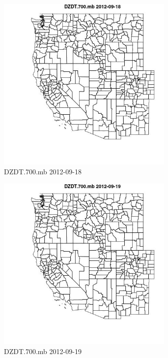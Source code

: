 \begin{figure} 
\centering  
\includegraphics[width=0.77\textwidth]{Code_Outputs/ML_input_report_ML_input_PM25_Step5_part_d_de_duplicated_aves_ML_input_MapObsDZDT700mb2012-09-18.jpg} 
\caption{\label{fig:ML_input_report_ML_input_PM25_Step5_part_d_de_duplicated_aves_ML_inputMapObsDZDT700mb2012-09-18}DZDT.700.mb 2012-09-18} 
\end{figure} 
 

\begin{figure} 
\centering  
\includegraphics[width=0.77\textwidth]{Code_Outputs/ML_input_report_ML_input_PM25_Step5_part_d_de_duplicated_aves_ML_input_MapObsDZDT700mb2012-09-19.jpg} 
\caption{\label{fig:ML_input_report_ML_input_PM25_Step5_part_d_de_duplicated_aves_ML_inputMapObsDZDT700mb2012-09-19}DZDT.700.mb 2012-09-19} 
\end{figure} 
 

